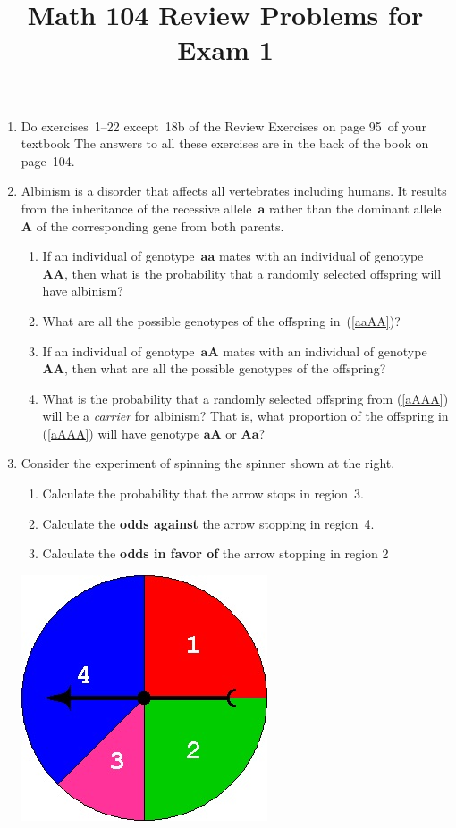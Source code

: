 \documentclass[12pt]{article}
\author{}\date{}
\title{Math 104 Review Problems for Exam 1}\author{}
\begin{document}
\maketitle
\pagestyle{empty}
\begin{enumerate}
\item Do exercises~1--22 except~18b of the Review Exercises
on page 95~of your textbook
The answers to all these exercises are in the
back of the book on page~104.
\item Albinism is a disorder that affects all vertebrates
including humans. It results from the inheritance
of the recessive allele~$\mathbold{a}$ rather than the dominant
allele~$\mathbold{A}$
of the corresponding gene from both parents.
\begin{enumerate}
\item\label{aaAA} If an individual of
genotype~$\mathbold{aa}$ mates with
an individual of genotype~$\mathbold{AA}$,
then what is the probability
that a randomly selected offspring will have albinism?
\item What are all the possible genotypes of the offspring
in~(\ref{aaAA})?
\item\label{aAAA} If an individual of
genotype~$\mathbold{aA}$ mates with
an individual of genotype~$\mathbold{AA}$, then
what are all the possible genotypes of the offspring?
\item What is the probability that a randomly selected
offspring from (\ref{aAAA})
will be a {\em carrier} for albinism? That is,
what proportion of the offspring in  (\ref{aAAA})
will have genotype $\mathbold{aA}$ or $\mathbold{Aa}$?
\end{enumerate}

\item\label{Spinner}\begin{multicols}{2}
Consider the experiment of spinning the spinner
shown at the right.
\begin{enumerate}
\item Calculate the probability that the arrow stops
in region~3.
\item Calculate the {\bf odds against} the arrow stopping
in region~4.
\item Calculate the {\bf odds in favor of} the arrow
stopping in region 2
\end{enumerate}
\includegraphics[scale=.5]{R1Spinner}
\end{multicols}


\end{enumerate}
\end{document}
